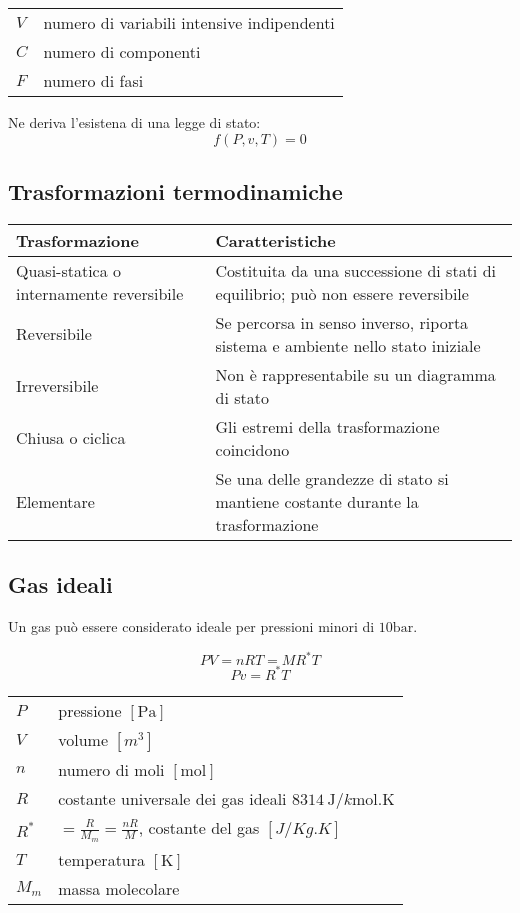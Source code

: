 \begin{tabular}{ll}
    $V$ & numero di variabili intensive indipendenti \\
    $C$ & numero di componenti \\
    $F$ & numero di fasi \\
\end{tabular}

Ne deriva l'esistena di una legge di stato:
\[f(P, v, T) = 0\]

\subsection{Trasformazioni termodinamiche}
\begin{tabular}{p{3.1cm}p{4cm}}
    \toprule
    Trasformazione & Caratteristiche \\
    \midrule
    Quasi-statica o \newline internamente reversibile & Costituita da una successione di stati di equilibrio; può non essere reversibile \\
    Reversibile & Se percorsa in senso inverso, riporta sistema e ambiente nello stato iniziale \\
    Irreversibile & Non è rappresentabile su un diagramma di stato \\
    Chiusa o ciclica & Gli estremi della trasformazione coincidono \\
    Elementare & Se una delle grandezze di stato si mantiene costante durante la trasformazione \\
    \bottomrule
\end{tabular}

\subsection{Gas ideali}
Un gas può essere considerato ideale per pressioni minori di $\si{10\bar}$.

\[PV = nRT = MR^*T\]
\[Pv = R^*T \]
\begin{tabular}{ll}
    $P$ & pressione $[\si{\pascal}]$ \\
    $V$ & volume $[\si{m^3}]$ \\
    $n$ & numero di moli $[\si{\mol}]$ \\
    $R$ & costante universale dei gas ideali $\SI{8314}{\J/k\mol.\K}$ \\
    $R^*$ &$= \frac{R}{M_m} = \frac{nR}{M}$, costante del gas $[\si{J/Kg.K}]$\\
    $T$ & temperatura $[\si{\K}]$ \\
    $M_m$ & massa molecolare \\
\end{tabular}

